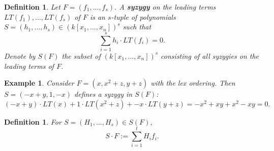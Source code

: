 \documentclass{beamer}
\newtheorem{defn}[prop]{Definition}
\newtheorem{ex}{Example}
\begin{document}



\begin{frame}
\begin{footnotesize}
\begin{defn}
Let $F = (f_1,...,f_s)$. A \textbf{syzygy} on the leading terms $LT(f_1),...,LT(f_s)$ of $F$ is an $s$-tuple of polynomials $S = (h_1,...,h_s)\in (k[x_1,...,x_n])^s$ such that $$\sum_{i=1}^s h_i\cdot LT(f_i) = 0.$$
Denote by $S(F)$ the subset of $(k[x_1,...,x_n])^s$ consisting of all syzygies on the leading terms of $F$. 
\end{defn}
\pause
\begin{ex}
Consider $F = (x,x^2+z,y+z)$ with the lex ordering. Then $S = (-x+y,1,-x)$ defines a syzygy in $S(F)$: $$(-x+y)\cdot LT(x) + 1\cdot LT(x^2+z) + -x\cdot LT(y+z) = -x^2 +xy + x^2 -xy = 0.$$
\end{ex}
\pause
\begin{defn}
For $S = (H_1,...,H_s)\in S(F)$, 
$$S\cdot F := \sum_{i = 1}^t H_if_i.$$
\end{defn}

\end{footnotesize}
\end{frame}


\end{document}
